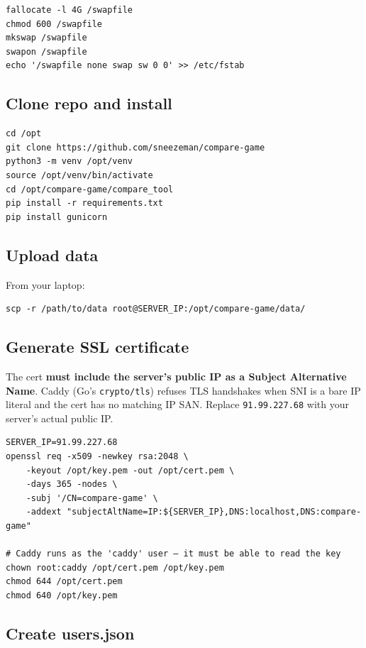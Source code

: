 \documentclass[11pt]{article}
\begin{document}
\begin{lstlisting}
fallocate -l 4G /swapfile
chmod 600 /swapfile
mkswap /swapfile
swapon /swapfile
echo '/swapfile none swap sw 0 0' >> /etc/fstab
\end{lstlisting}

\subsection{Clone repo and install}

\begin{lstlisting}
cd /opt
git clone https://github.com/sneezeman/compare-game
python3 -m venv /opt/venv
source /opt/venv/bin/activate
cd /opt/compare-game/compare_tool
pip install -r requirements.txt
pip install gunicorn
\end{lstlisting}

\subsection{Upload data}

From your laptop:
\begin{lstlisting}
scp -r /path/to/data root@SERVER_IP:/opt/compare-game/data/
\end{lstlisting}

\subsection{Generate SSL certificate}

The cert \textbf{must include the server's public IP as a Subject Alternative Name}. Caddy (Go's \texttt{crypto/tls}) refuses TLS handshakes when SNI is a bare IP literal and the cert has no matching IP SAN. Replace \texttt{91.99.227.68} with your server's actual public IP.

\begin{lstlisting}
SERVER_IP=91.99.227.68
openssl req -x509 -newkey rsa:2048 \
    -keyout /opt/key.pem -out /opt/cert.pem \
    -days 365 -nodes \
    -subj '/CN=compare-game' \
    -addext "subjectAltName=IP:${SERVER_IP},DNS:localhost,DNS:compare-game"

# Caddy runs as the 'caddy' user — it must be able to read the key
chown root:caddy /opt/cert.pem /opt/key.pem
chmod 644 /opt/cert.pem
chmod 640 /opt/key.pem
\end{lstlisting}

\subsection{Create users.json}
\end{document}
